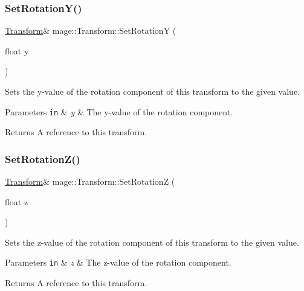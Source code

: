 \subsubsection{\texorpdfstring{Set\+Rotation\+Y()}{SetRotationY()}}
{\footnotesize\ttfamily \hyperlink{structmage_1_1_transform}{Transform}\& mage\+::\+Transform\+::\+Set\+RotationY (\begin{DoxyParamCaption}\item[{float}]{y }\end{DoxyParamCaption})}

Sets the y-\/value of the rotation component of this transform to the given value.


\begin{DoxyParams}[1]{Parameters}
\mbox{\tt in}  & {\em y} & The y-\/value of the rotation component. \\
\hline
\end{DoxyParams}
\begin{DoxyReturn}{Returns}
A reference to this transform. 
\end{DoxyReturn}
\hypertarget{structmage_1_1_transform_aca3f1ea79f7559b0a1e59ac62e268df0}{}\label{structmage_1_1_transform_aca3f1ea79f7559b0a1e59ac62e268df0} 
\subsubsection{\texorpdfstring{Set\+Rotation\+Z()}{SetRotationZ()}}
{\footnotesize\ttfamily \hyperlink{structmage_1_1_transform}{Transform}\& mage\+::\+Transform\+::\+Set\+RotationZ (\begin{DoxyParamCaption}\item[{float}]{z }\end{DoxyParamCaption})}

Sets the z-\/value of the rotation component of this transform to the given value.


\begin{DoxyParams}[1]{Parameters}
\mbox{\tt in}  & {\em z} & The z-\/value of the rotation component. \\
\hline
\end{DoxyParams}
\begin{DoxyReturn}{Returns}
A reference to this transform. 
\end{DoxyReturn}
\hypertarget{structmage_1_1_transform_a334ea52f7dc62ed66cbcb0687bbd530c}{}\label{structmage_1_1_transform_a334ea52f7dc62ed66cbcb0687bbd530c} 
